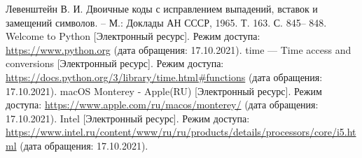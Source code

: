 \documentclass[a4paper,14pt, unknownkeysallowed]{extreport}
\begin{document}
\begin{thebibliography}{5}
	Левенштейн В. И. Двоичные коды с исправлением выпадений, вставок и замещений символов. – М.: Доклады АН СССР, 1965. Т. 163. С. 845– 848.
	Welcome to Python [Электронный ресурс]. Режим доступа: \url{https://www.python.org} (дата обращения: 17.10.2021).
	time — Time access and conversions [Электронный ресурс]. Режим доступа: \url{https://docs.python.org/3/library/time.html#functions} (дата обращения: 17.10.2021).
	macOS Monterey - Apple(RU) [Электронный ресурс]. Режим доступа: \url{https://www.apple.com/ru/macos/monterey/} (дата обращения: 17.10.2021).
	Intel [Электронный ресурс]. Режим доступа: \url{https://www.intel.ru/content/www/ru/ru/products/details/processors/core/i5.html} (дата обращения: 17.10.2021).
\end{thebibliography}

\end{document}
